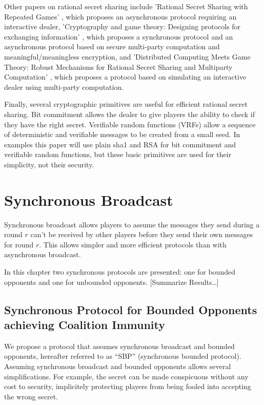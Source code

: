 \documentclass{dalcsthesis}
\begin{document}
Other papers on rational secret sharing include 'Rational Secret Sharing with Repeated Games' \cite{maleka08}, which proposes an asynchronous protocol requiring an interactive dealer, 'Cryptography and game theory: Designing protocols for exchanging information' \cite{kol08-2}, which proposes a synchronous protocol and an asynchronous protocol based on secure multi-party computation and meaningful/meaningless encryption, and 'Distributed Computing Meets Game Theory: Robust Mechanisms for Rational Secret Sharing and Multiparty Computation' \cite{abraham06}, which proposes a protocol based on simulating an interactive dealer using multi-party computation.

Finally, several cryptographic primitives are useful for efficient rational secret sharing. Bit commitment \cite{naor91} allows the dealer to give players the ability to check if they have the right secret. Verifiable random functions (VRFs) \cite{micali99, dis05} allow a sequence of deterministic and verifiable messages to be created from a small seed. In examples this paper will use plain sha1 and RSA for bit commitment and verifiable random functions, but these basic primitives are used for their simplicity, not their security.




\chapter{Synchronous Broadcast}

Synchronous broadcast allows players to assume the messages they send during a round $r$ can't be received by other players before they send their own messages for round $r$. This allows simpler and more efficient protocols than with asynchronous broadcast.

In this chapter two synchronous protocols are presented: one for bounded opponents and one for unbounded opponents. [Summarize Results\ldots]



\section{Synchronous Protocol for Bounded Opponents achieving Coalition Immunity}

We propose a protocol that assumes synchronous broadcast and bounded opponents, hereafter referred to as ``SBP'' (synchronous bounded protocol). Assuming synchronous broadcast and bounded opponents allows several simplifications. For example, the secret can be made conspicuous without any cost to security, implicitely protecting players from being fooled into accepting the wrong secret.
\end{document}
